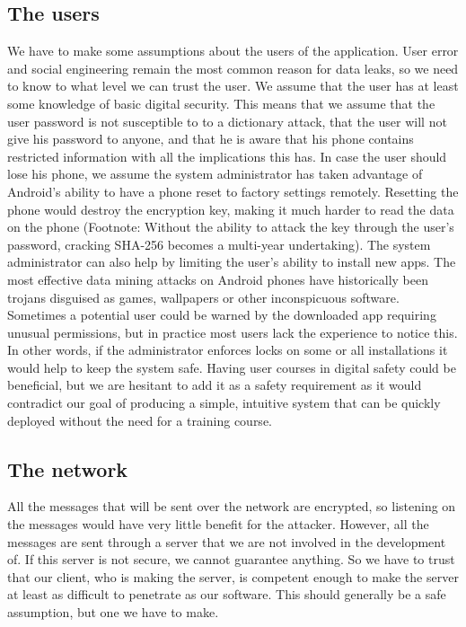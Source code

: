 \subsection{The users}
We have to make some assumptions about the users of the application. User error and social engineering remain the most common reason for data leaks, so we need to know to what level we can trust the user.
\newline
\newline
We assume that the user has at least some knowledge of basic digital security. This means that we assume that the user password is not susceptible to to a dictionary attack, that the user will not give his password to anyone, and that he is aware that his phone contains restricted information with all the implications this has. 
\newline
\newline
In case the user should lose his phone, we assume the system administrator has taken advantage of Android’s ability to have a phone reset to factory settings remotely. Resetting the phone would destroy the encryption key, making it much harder to read the data on the phone (Footnote: Without the ability to attack the key through the user’s password, cracking SHA-256 becomes a multi-year undertaking).
\newline
\newline
The system administrator can also help by limiting the user’s ability to install new apps. The most effective data mining attacks on Android phones have historically been trojans disguised as games, wallpapers or other inconspicuous software. Sometimes a potential user could be warned by the downloaded app requiring unusual permissions, but in practice most users lack the experience to notice this. In other words, if the administrator enforces locks on some or all installations it would help to keep the system safe.
\newline
\newline
Having user courses in digital safety could be beneficial, but we are hesitant to add it as a safety requirement as it would contradict our goal of producing a simple, intuitive system that can be quickly deployed without the need for a training course. 

\subsection{The network}
All the messages that will be sent over the network are encrypted, so listening on the messages would have very little benefit for the attacker. However, all the messages are sent through a server that we are not involved in the development of. If this server is not secure, we cannot guarantee anything. So we have to trust that our client, who is making the server, is competent enough to make the server at least as difficult to penetrate as our software. This should generally be a safe assumption, but one we have to make.